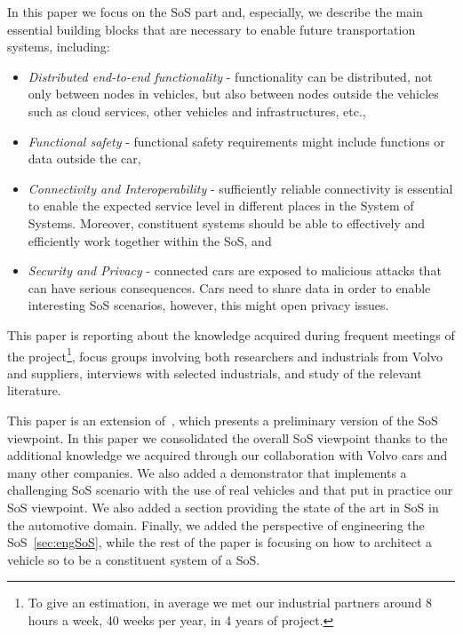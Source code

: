 In this paper we focus on the SoS part and, especially, we describe the main essential building blocks that are necessary to enable future transportation systems, including: 

\begin{itemize}
\item {\em Distributed end-to-end functionality} - functionality can be distributed, not only between nodes in vehicles, but also between nodes outside the vehicles such as cloud services, other vehicles and infrastructures, etc., 
\item {\em Functional safety} - functional safety requirements might include functions or data outside the car, 
\item {\em Connectivity and Interoperability} - sufficiently reliable connectivity is essential to enable the expected service level in different places in the System of Systems. Moreover, constituent systems should be able to effectively and efficiently work together within the SoS, and 
\item {\em Security and Privacy} - connected cars are exposed to malicious attacks that can have serious consequences. Cars need to share data in order to enable interesting SoS scenarios, however, this might open privacy issues.
\end{itemize}

This paper is reporting about the knowledge acquired during frequent meetings of the project\footnote{To give an estimation, in average we met our industrial partners around 8 hours a week, 40 weeks per year, in 4 years of project.}, %
focus groups involving both researchers and industrials from Volvo and suppliers, interviews with selected industrials, and study of the relevant literature.

This paper is an extension of~\cite{Pelliccione2017_SoS}, which presents a preliminary version of the SoS viewpoint. In this paper we consolidated the overall SoS viewpoint thanks to the additional knowledge we acquired through our collaboration with Volvo cars and many other companies. %
We also added a demonstrator that implements a challenging SoS scenario with the use of real vehicles and that put in practice our SoS viewpoint. We also added a section providing the state of the art in SoS in the automotive domain. Finally, we added the perspective of engineering the SoS~\ref{sec:engSoS}, while the rest of the paper is focusing on how to architect a vehicle so to be a constituent system of a SoS.


